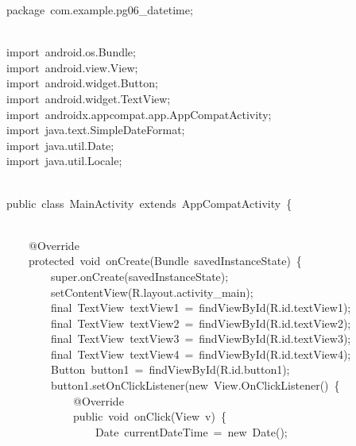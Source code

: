 {\ttfamily\small package\ com.example.pg06\_datetime;} \\
\strut \\
{\ttfamily\small import\ android.os.Bundle;} \\
{\ttfamily\small import\ android.view.View;} \\
{\ttfamily\small import\ android.widget.Button;} \\
{\ttfamily\small import\ android.widget.TextView;} \\
{\ttfamily\small import\ androidx.appcompat.app.AppCompatActivity;} \\
{\ttfamily\small import\ java.text.SimpleDateFormat;} \\
{\ttfamily\small import\ java.util.Date;} \\
{\ttfamily\small import\ java.util.Locale;} \\
\strut \\
{\ttfamily\small public\ class\ MainActivity\ extends\ AppCompatActivity\ \{} \\
\strut \\
{\ttfamily\small \ \ \ \ @Override} \\
{\ttfamily\small \ \ \ \ protected\ void\ onCreate(Bundle\ savedInstanceState)\ \{} \\
{\ttfamily\small \ \ \ \ \ \ \ \ super.onCreate(savedInstanceState);} \\
{\ttfamily\small \ \ \ \ \ \ \ \ setContentView(R.layout.activity\_main);} \\
{\ttfamily\small \ \ \ \ \ \ \ \ final\ TextView\ textView1\ =\ findViewById(R.id.textView1);} \\
{\ttfamily\small \ \ \ \ \ \ \ \ final\ TextView\ textView2\ =\ findViewById(R.id.textView2);} \\
{\ttfamily\small \ \ \ \ \ \ \ \ final\ TextView\ textView3\ =\ findViewById(R.id.textView3);} \\
{\ttfamily\small \ \ \ \ \ \ \ \ final\ TextView\ textView4\ =\ findViewById(R.id.textView4);} \\
{\ttfamily\small \ \ \ \ \ \ \ \ Button\ button1\ =\ findViewById(R.id.button1);} \\
{\ttfamily\small \ \ \ \ \ \ \ \ button1.setOnClickListener(new\ View.OnClickListener()\ \{} \\
{\ttfamily\small \ \ \ \ \ \ \ \ \ \ \ \ @Override} \\
{\ttfamily\small \ \ \ \ \ \ \ \ \ \ \ \ public\ void\ onClick(View\ v)\ \{} \\
{\ttfamily\small \ \ \ \ \ \ \ \ \ \ \ \ \ \ \ \ Date\ currentDateTime\ =\ new\ Date();} \\
